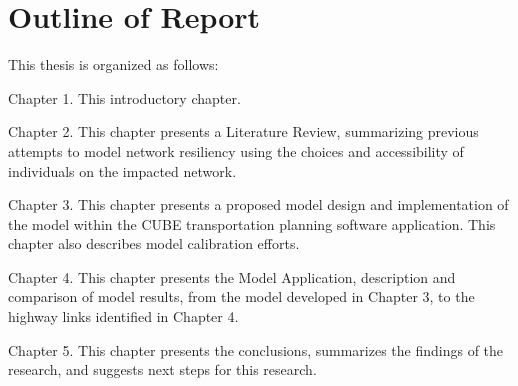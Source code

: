 \newpage
\section{Outline of Report}

\noindent This thesis is organized as follows:

\begin{description}
	\item Chapter 1.	This introductory chapter.
	\item Chapter 2.	This chapter presents a Literature Review, summarizing previous attempts to model network resiliency using the choices and accessibility of individuals on the impacted network.
	\item Chapter 3.	This chapter presents a proposed model design and implementation of the model within the CUBE transportation planning software application. This chapter also describes model calibration efforts.
  \item Chapter 4.	This chapter presents the Model Application, description and comparison of model results, from the model developed in Chapter 3, to the highway links identified in Chapter 4.
	\item Chapter 5.	This chapter presents the conclusions, summarizes the findings of the research, and suggests next steps for this research.\item
\end{description}
